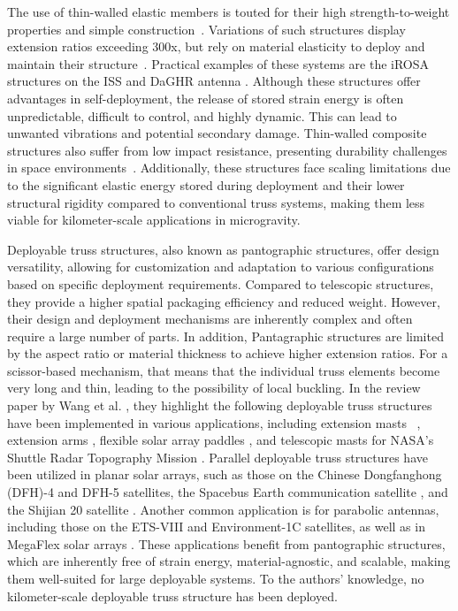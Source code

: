 {The use of thin-walled elastic members is touted for their high strength-to-weight properties and simple construction~\cite{fernandez_advanced_2017,yang_wrapping_2019,salazar_experimental_2021}. Variations of such structures display extension ratios exceeding 300x, but rely on material elasticity to deploy and maintain their structure~\cite{salazar_experimental_2021}. {Practical examples of these systems are the iROSA structures on the ISS \cite{schwanbeck2019advanced} and DaGHR antenna \cite{kelly2016scalable}. Although these structures offer advantages in self-deployment, the release of stored strain energy is often unpredictable, difficult to control, and highly dynamic. This can lead to unwanted vibrations and potential secondary damage. Thin-walled composite structures also suffer from low impact resistance, presenting durability challenges in space environments~\cite{noauthor_lightweight_2004}. Additionally, these structures face scaling limitations due to the significant elastic energy stored during deployment and their lower structural rigidity compared to conventional truss systems, making them less viable for kilometer-scale applications in microgravity.}} 

{Deployable truss structures, also known as pantographic structures, offer design versatility, allowing for customization and adaptation to various configurations based on specific deployment requirements. Compared to telescopic structures, they provide a higher spatial packaging efficiency and reduced weight. However, their design and deployment mechanisms are inherently complex and often require a large number of parts. In addition, Pantagraphic structures are limited by the aspect ratio or material thickness to achieve higher extension ratios. For a scissor-based mechanism, that means that the individual truss elements become very long and thin, leading to the possibility of local buckling. In the review paper by Wang et al. \cite{WANG2024112557}, they highlight the following deployable truss structures have been implemented in various applications, including extension masts ~\cite{kitamura1990development, tibert_deployable_nodate,perez-valcarcel_new_2021,kim_deployable_2021,puig_review_2010}, extension arms \cite{choi2019design}, flexible solar array paddles \cite{kojima1996development}, and telescopic masts for NASA’s Shuttle Radar Topography Mission \cite{umland2012STRM}. Parallel deployable truss structures have been utilized in planar solar arrays, such as those on the Chinese Dongfanghong (DFH)-4 \cite{yuanyuan2022parameter} and DFH-5 \cite{ma2022recent} satellites, the Spacebus Earth communication satellite \cite{tian2021research}, and the Shijian 20 satellite \cite{cui2020orbit}. Another common application is for parabolic antennas, including those on the ETS-VIII \cite{meguro2009orbit} and Environment-1C \cite{shi2014design} satellites, as well as in MegaFlex solar arrays \cite{zhou2015development}. These applications benefit from pantographic structures, which are inherently free of strain energy, material-agnostic, and scalable, making them well-suited for large deployable systems. To the authors' knowledge, no kilometer-scale deployable truss structure has been deployed.} 

